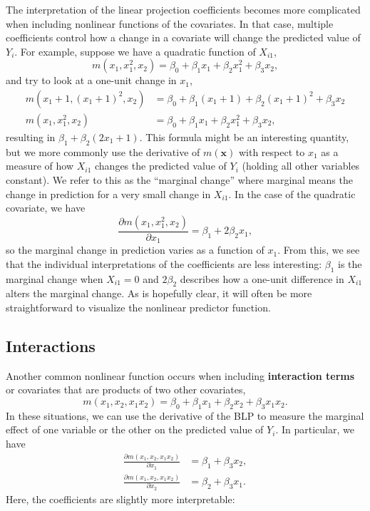 \documentclass[
  13pt,
  letterpaper,
  DIV=11,
  numbers=noendperiod]{scrreprt}
\newcommand{\mb}{\bm}
\newcommand{\bfx}{\mb{x}}
\theoremstyle{plain}
\theoremstyle{plain}
\theoremstyle{definition}
\theoremstyle{definition}
\theoremstyle{remark}
\begin{document}
The interpretation of the linear projection coefficients becomes more
complicated when including nonlinear functions of the covariates. In
that case, multiple coefficients control how a change in a covariate
will change the predicted value of \(Y_i\). For example, suppose we have
a quadratic function of \(X_{i1}\), \[ 
m(x_1, x_1^2, x_{2}) = \beta_{0} + \beta_{1}x_{1} + \beta_{2}x_{1}^{2} + \beta_{3}x_{2},
\] and try to look at a one-unit change in \(x_1\), \[ 
\begin{aligned}
  m(x_{1} + 1, (x_{1} + 1)^{2}, x_{2}) & = \beta_{0} + \beta_{1}(x_{1} + 1) + \beta_{2}(x_{1} + 1)^{2}+ \beta_{3}x_{2} \\
  m(x_{1}, x_{1}^{2}, x_{2}) &= \beta_{0} + \beta_{1}x_{1} + \beta_{2}x_{1}^{2} + \beta_{3}x_{2},
\end{aligned} 
\] resulting in \(\beta_1 + \beta_2(2x_{1} + 1)\). This formula might be
an interesting quantity, but we more commonly use the derivative of
\(m(\bfx)\) with respect to \(x_1\) as a measure of how \(X_{i1}\)
changes the predicted value of \(Y_i\) (holding all other variables
constant). We refer to this as the ``marginal change'' where marginal
means the change in prediction for a very small change in \(X_{i1}\). In
the case of the quadratic covariate, we have \[ 
\frac{\partial m(x_{1}, x_{1}^{2}, x_{2})}{\partial x_{1}} = \beta_{1} + 2\beta_{2}x_{1},
\] so the marginal change in prediction varies as a function of \(x_1\).
From this, we see that the individual interpretations of the
coefficients are less interesting: \(\beta_1\) is the marginal change
when \(X_{i1} = 0\) and \(2\beta_2\) describes how a one-unit difference
in \(X_{i1}\) alters the marginal change. As is hopefully clear, it will
often be more straightforward to visualize the nonlinear predictor
function.

\subsection{Interactions}\label{interactions}

Another common nonlinear function occurs when including
\textbf{interaction terms} or covariates that are products of two other
covariates, \[ 
m(x_{1}, x_{2}, x_{1}x_{2}) = \beta_{0} + \beta_{1}x_{1} + \beta_{2}x_{2} + \beta_{3}x_{1}x_{2}.
\] In these situations, we can use the derivative of the BLP to measure
the marginal effect of one variable or the other on the predicted value
of \(Y_i\). In particular, we have \[ 
\begin{aligned}
  \frac{\partial m(x_{1}, x_{2}, x_{1}x_{2})}{\partial x_1} &= \beta_1 + \beta_3x_2, \\
  \frac{\partial m(x_{1}, x_{2}, x_{1}x_{2})}{\partial x_2} &= \beta_2 + \beta_3x_1.
\end{aligned}
\] Here, the coefficients are slightly more interpretable:
\end{document}
